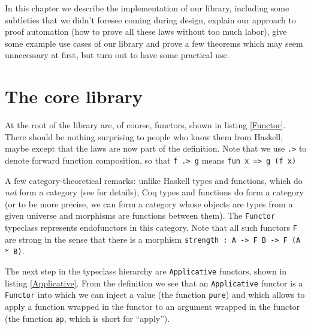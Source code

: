 \documentclass[declaration,inz,english,shortabstract]{iithesis}
\newcommand{\m}[1]{\texttt{#1}}
\begin{document}
In this chapter we describe the implementation of our library, including some subtleties that we didn't foresee coming during design, explain our approach to proof automation (how to prove all these laws without too much labor), give some example use cases of our library and prove a few theorems which may seem unnecessary at first, but turn out to have some practical use.

\section{The core library}


At the root of the library are, of course, functors, shown in listing \ref{Functor}. There should be nothing surprising to people who know them from Haskell, maybe except that the laws are now part of the definition. Note that we use \m{.>} to denote forward function composition, so that \m{f .> g} means \m{fun x => g (f x)}

A few category-theoretical remarks: unlike Haskell types and functions, which do \textit{not} form a category (see \cite{Hask} for details), Coq types and functions do form a category (or to be more precise, we can form a category whose objects are types from a given universe and morphisms are functions between them). The \m{Functor} typeclass represents endofunctors in this category. Note that all such functors \m{F} are strong in the sense that there is a morphism \m{strength : A -> F B -> F (A * B)}.


The next step in the typeclass hierarchy are \m{Applicative} functors, shown in listing \ref{Applicative}. From the definition we see that an \m{Applicative} functor is a \m{Functor} into which we can inject a value (the function \m{pure}) and which allows to apply a function wrapped in the functor to an argument wrapped in the functor (the function \m{ap}, which is short for ``apply'').
\end{document}
